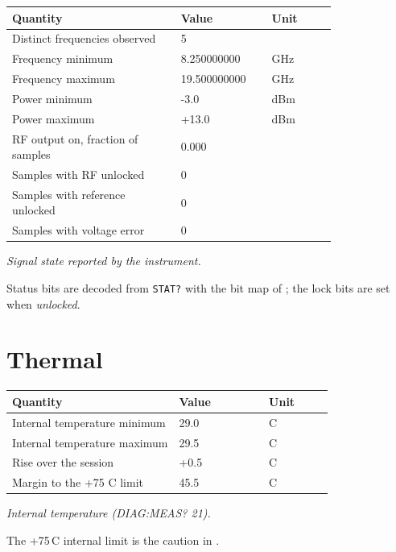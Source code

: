 \documentclass[11pt]{article}
\begin{document}
\begin{center}
\begin{tabular}{@{}p{0.52\linewidth}p{0.28\linewidth}l@{}}
\toprule
\textbf{Quantity} & \textbf{Value} & \textbf{Unit} \\
\midrule
Distinct frequencies observed & 5 &  \\
Frequency minimum & 8.250000000 & GHz \\
Frequency maximum & 19.500000000 & GHz \\
Power minimum & -3.0 & dBm \\
Power maximum & +13.0 & dBm \\
RF output on, fraction of samples & 0.000 &  \\
Samples with RF unlocked & 0 &  \\
Samples with reference unlocked & 0 &  \\
Samples with voltage error & 0 &  \\
\bottomrule
\end{tabular}

\emph{Signal state reported by the instrument.}
\end{center}

Status bits are decoded from \texttt{STAT?} with the bit map of
\cite[Table 5]{nicomms}; the lock bits are set when \emph{unlocked}.

\section{Thermal}

\begin{center}
\begin{tabular}{@{}p{0.52\linewidth}p{0.28\linewidth}l@{}}
\toprule
\textbf{Quantity} & \textbf{Value} & \textbf{Unit} \\
\midrule
Internal temperature minimum & 29.0 & \textdegree{}C \\
Internal temperature maximum & 29.5 & \textdegree{}C \\
Rise over the session & +0.5 & \textdegree{}C \\
Margin to the +75 \textdegree{}C limit & 45.5 & \textdegree{}C \\
\bottomrule
\end{tabular}

\emph{Internal temperature (DIAG:MEAS? 21).}
\end{center}

The +75\,\textdegree{}C internal limit is the caution in \cite{niguide}.
\end{document}
